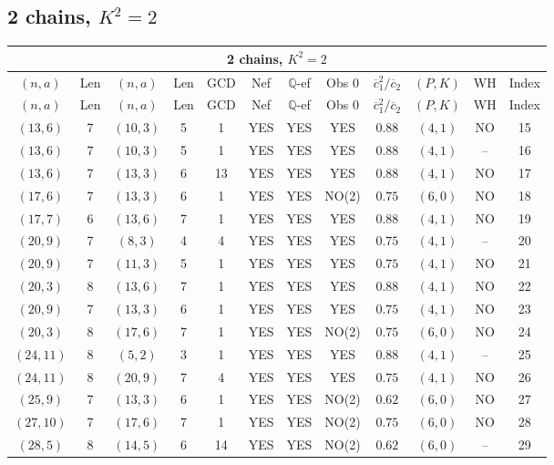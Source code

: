 \subsection{2 chains, $K^2 = 2$}
\begin{longtable}{|c|c|c|c|c|c|c|c|c|c|c|c|}
\hline
\multicolumn{12}{|c|}{2 chains, $K^2 = 2$}\\
\hline
$(n,a)$ & Len & $(n,a)$ & Len & GCD & Nef & $\mathbb Q$-ef & Obs 0 & $\overline c_1^2 / \overline c_2$ & $(P,K)$ & WH & Index\\
\hline
\endfirsthead

\hline
$(n,a)$ & Len & $(n,a)$ & Len & GCD & Nef & $\mathbb Q$-ef & Obs 0 & $\overline c_1^2 / \overline c_2$ & $(P,K)$ & WH & Index\\
\hline
\endhead
\hline
\endfoot

$(13,6)$ & 7 & $(10,3)$ & 5 & 1 & YES & YES & YES & $0.88$ & $(4,1)$ & NO & 15\\
$(13,6)$ & 7 & $(10,3)$ & 5 & 1 & YES & YES & YES & $0.88$ & $(4,1)$ & -- & 16\\
$(13,6)$ & 7 & $(13,3)$ & 6 & 13 & YES & YES & YES & $0.88$ & $(4,1)$ & NO & 17\\
$(17,6)$ & 7 & $(13,3)$ & 6 & 1 & YES & YES & NO(2) & $0.75$ & $(6,0)$ & NO & 18\\
$(17,7)$ & 6 & $(13,6)$ & 7 & 1 & YES & YES & YES & $0.88$ & $(4,1)$ & NO & 19\\
$(20,9)$ & 7 & $(8,3)$ & 4 & 4 & YES & YES & YES & $0.75$ & $(4,1)$ & -- & 20\\
$(20,9)$ & 7 & $(11,3)$ & 5 & 1 & YES & YES & YES & $0.75$ & $(4,1)$ & NO & 21\\
$(20,3)$ & 8 & $(13,6)$ & 7 & 1 & YES & YES & YES & $0.88$ & $(4,1)$ & NO & 22\\
$(20,9)$ & 7 & $(13,3)$ & 6 & 1 & YES & YES & YES & $0.75$ & $(4,1)$ & NO & 23\\
$(20,3)$ & 8 & $(17,6)$ & 7 & 1 & YES & YES & NO(2) & $0.75$ & $(6,0)$ & NO & 24\\
$(24,11)$ & 8 & $(5,2)$ & 3 & 1 & YES & YES & YES & $0.88$ & $(4,1)$ & -- & 25\\
$(24,11)$ & 8 & $(20,9)$ & 7 & 4 & YES & YES & YES & $0.75$ & $(4,1)$ & NO & 26\\
$(25,9)$ & 7 & $(13,3)$ & 6 & 1 & YES & YES & NO(2) & $0.62$ & $(6,0)$ & NO & 27\\
$(27,10)$ & 7 & $(17,6)$ & 7 & 1 & YES & YES & NO(2) & $0.75$ & $(6,0)$ & NO & 28\\
$(28,5)$ & 8 & $(14,5)$ & 6 & 14 & YES & YES & NO(2) & $0.62$ & $(6,0)$ & -- & 29\\

\end{longtable}
